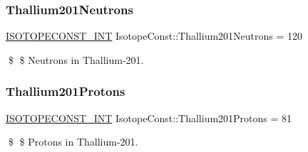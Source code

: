 \subsubsection{\texorpdfstring{Thallium201\+Neutrons}{Thallium201Neutrons}}
{\footnotesize\ttfamily \mbox{\hyperlink{group___isotope_const-_macros_ga5f18360b3e99483a35c32d789e62621c}{I\+S\+O\+T\+O\+P\+E\+C\+O\+N\+S\+T\+\_\+\+I\+NT}} Isotope\+Const\+::\+Thallium201\+Neutrons = 120}

\$ \$ Neutrons in Thallium-\/201. \mbox{\label{group___isotope_const-_thallium-_tl201_gaf86082f0095e6605570dc2731ba828a7}} 
\subsubsection{\texorpdfstring{Thallium201\+Protons}{Thallium201Protons}}
{\footnotesize\ttfamily \mbox{\hyperlink{group___isotope_const-_macros_ga5f18360b3e99483a35c32d789e62621c}{I\+S\+O\+T\+O\+P\+E\+C\+O\+N\+S\+T\+\_\+\+I\+NT}} Isotope\+Const\+::\+Thallium201\+Protons = 81}

\$ \$ Protons in Thallium-\/201. 